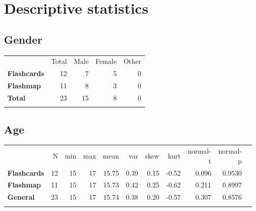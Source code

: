 \chapter{Descriptive statistics}
\label{app:descriptives}

\FloatBarrier
\section{Gender}

\begin{longtable}[c]{@{}lrrrr@{}}
\toprule\addlinespace
& Total & Male & Female & Other
\\\addlinespace
\midrule\endhead
\textbf{Flashcards} & 12 & 7 & 5 & 0
\\\addlinespace
\textbf{Flashmap} & 11 & 8 & 3 & 0
\\\addlinespace
\textbf{Total} & 23 & 15 & 8 & 0
\\\addlinespace
\bottomrule
    \label{tab:gender}
\end{longtable}

\FloatBarrier
\section{Age}

\begin{longtable}[c]{@{}lrrrrrrrrrr@{}}
\toprule\addlinespace
& N & min & max & mean & var & skew & kurt & normal-t & normal-p
\\\addlinespace
\midrule\endhead
\textbf{Flashcards} & 12 & 15 & 17 & 15.75 & 0.39 & 0.15 & -0.52 & 0.096
& 0.9530
\\\addlinespace
\textbf{Flashmap} & 11 & 15 & 17 & 15.73 & 0.42 & 0.25 & -0.62 & 0.211 &
0.8997
\\\addlinespace
\textbf{General} & 23 & 15 & 17 & 15.74 & 0.38 & 0.20 & -0.57 & 0.307 &
0.8576
\\\addlinespace
\bottomrule
    \label{tab:age}
\end{longtable}

